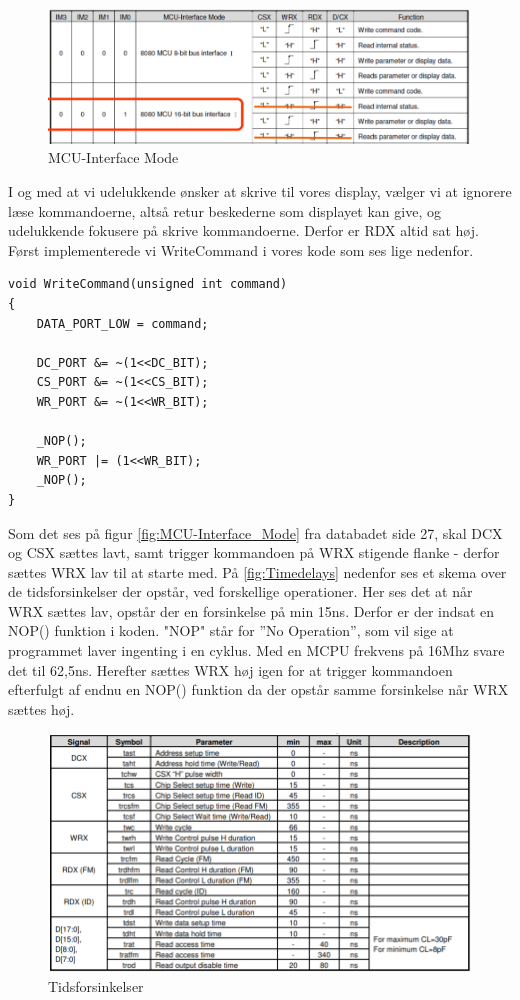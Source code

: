 \begin{figure}[H]
	\centering
	\includegraphics[width = 400pt]{Img/MCU-Interface_Mode.png}
	\caption{MCU-Interface Mode}
	\label{fig:MCU-Interface_Mode}
\end{figure}

I og med at vi udelukkende ønsker at skrive til vores display, vælger vi at ignorere læse kommandoerne, altså retur beskederne som displayet kan give, og udelukkende fokusere på skrive kommandoerne. Derfor er RDX altid sat høj.
Først implementerede vi WriteCommand i vores kode som ses lige nedenfor.


\begin{lstlisting}
void WriteCommand(unsigned int command)
{
	DATA_PORT_LOW = command;

	DC_PORT &= ~(1<<DC_BIT);
	CS_PORT &= ~(1<<CS_BIT);
	WR_PORT &= ~(1<<WR_BIT);
	
	_NOP();
	WR_PORT |= (1<<WR_BIT);
	_NOP();
}

\end{lstlisting}


Som det ses på figur \autoref{fig:MCU-Interface_Mode} fra databadet\cite{man:ILI9341} side 27, skal DCX og CSX sættes lavt, samt trigger kommandoen på WRX stigende flanke - derfor sættes WRX lav til at starte med. På \autoref{fig:Timedelays} nedenfor ses et skema over de tidsforsinkelser der opstår, ved forskellige operationer. Her ses det at når WRX sættes lav, opstår der en forsinkelse på min 15ns. Derfor er der indsat en NOP() funktion i koden. "NOP" står for ”No Operation”, som vil sige at programmet laver ingenting i en cyklus. Med en MCPU frekvens på 16Mhz svare det til 62,5ns. Herefter sættes WRX høj igen for at trigger kommandoen efterfulgt af endnu en NOP() funktion da der opstår samme forsinkelse når WRX sættes høj.

\begin{figure}[H]
	\centering
	\includegraphics[width = 450pt]{Img/Timedelays.png}
	\caption{Tidsforsinkelser}
	\label{fig:Timedelays}
\end{figure}


